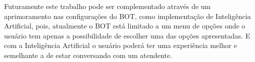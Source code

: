 Futuramente este trabalho pode ser complementado através de um aprimoramento nas configurações do BOT, como implementação de Inteligência Artificial, pois, atualmente o BOT está limitado a um menu de opções onde o usuário tem apenas a possibilidade de escolher uma das opções apresentadas. E com a Inteligência Artificial o usuário poderá ter uma experiência melhor e semelhante a de estar conversando com um atendente. 

\cite{scrum}
\cite{bots}
\cite{chatbot}
\cite{cookies}
\cite{ia}
\cite{ibm}
\cite{malware}
\cite{navint}
\cite{virus}
\cite{segint}
\cite{whats}
\cite{yagpdb}